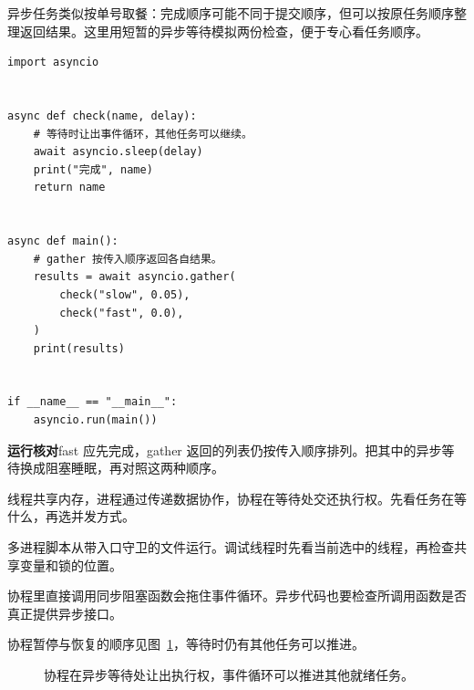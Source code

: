 \documentclass[UTF8,a4paper,oneside,openany,fontset=none,11pt]{ctexbook}
\newcommand{\code}[1]{\texttt{\detokenize{#1}}}
\begin{document}
异步任务类似按单号取餐：完成顺序可能不同于提交顺序，但可以按原任务顺序整理返回结果。这里用短暂的异步等待模拟两份检查，便于专心看任务顺序。

\begin{lstlisting}[title={\code{async_checks.py}}]
import asyncio


async def check(name, delay):
    # 等待时让出事件循环，其他任务可以继续。
    await asyncio.sleep(delay)
    print("完成", name)
    return name


async def main():
    # gather 按传入顺序返回各自结果。
    results = await asyncio.gather(
        check("slow", 0.05),
        check("fast", 0.0),
    )
    print(results)


if __name__ == "__main__":
    asyncio.run(main())
\end{lstlisting}

\textbf{运行核对}\enspace fast 应先完成，gather 返回的列表仍按传入顺序排列。把其中的异步等待换成阻塞睡眠，再对照这两种顺序。

\begin{myunderstanding}
线程共享内存，进程通过传递数据协作，协程在等待处交还执行权。先看任务在等什么，再选并发方式。
\end{myunderstanding}

\begin{pycharmpractice}
多进程脚本从带入口守卫的文件运行。调试线程时先看当前选中的线程，再检查共享变量和锁的位置。
\end{pycharmpractice}

\begin{pitfall}
协程里直接调用同步阻塞函数会拖住事件循环。异步代码也要检查所调用函数是否真正提供异步接口。
\end{pitfall}
协程暂停与恢复的顺序见图~\ref{fig:chapter-12-flow}，等待时仍有其他任务可以推进。
\begin{figure}[htbp]
  \centering
  \caption{协程在异步等待处让出执行权，事件循环可以推进其他就绪任务。}
  \label{fig:chapter-12-flow}
\end{figure}
\end{document}
